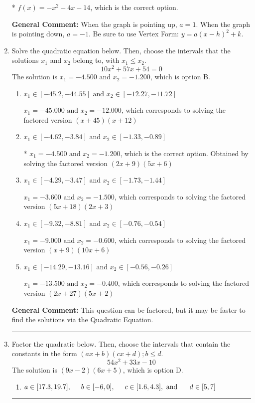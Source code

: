 \documentclass{extbook}[14pt]
\newcommand{\litem}[1]{\item #1

\rule{\textwidth}{0.4pt}}
\begin{document}
\begin{enumerate}
{\begin{enumerate}[label=\Alph*.]
* $f(x)=-x^{2} +4 x -14$, which is the correct option.
\end{enumerate}

\textbf{General Comment:} When the graph is pointing up, $a=1$. When the graph is pointing down, $a=-1$. Be sure to use Vertex Form: $y = a(x-h)^2+k$.
}
\litem{
Solve the quadratic equation below. Then, choose the intervals that the solutions $x_1$ and $x_2$ belong to, with $x_1 \leq x_2$.
\[ 10x^{2} +57 x + 54 = 0 \]
The solution is \( x_1 = -4.500 \text{ and } x_2 = -1.200 \), which is option B.\begin{enumerate}[label=\Alph*.]
\item \( x_1 \in [-45.2, -44.55] \text{ and } x_2 \in [-12.27, -11.72] \)

$x_1 = -45.000 \text{ and } x_2 = -12.000$, which corresponds to solving the factored version $(x + 45)(x + 12)$
\item \( x_1 \in [-4.62, -3.84] \text{ and } x_2 \in [-1.33, -0.89] \)

* $x_1 = -4.500 \text{ and } x_2 = -1.200$, which is the correct option. Obtained by solving the factored version $(2x + 9)(5x + 6)$
\item \( x_1 \in [-4.29, -3.47] \text{ and } x_2 \in [-1.73, -1.44] \)

$x_1 = -3.600 \text{ and } x_2 = -1.500$, which corresponds to solving the factored version $(5x + 18)(2x + 3)$
\item \( x_1 \in [-9.32, -8.81] \text{ and } x_2 \in [-0.76, -0.54] \)

$x_1 = -9.000 \text{ and } x_2 = -0.600$, which corresponds to solving the factored version $(x + 9)(10x + 6)$
\item \( x_1 \in [-14.29, -13.16] \text{ and } x_2 \in [-0.56, -0.26] \)

$x_1 = -13.500 \text{ and } x_2 = -0.400$, which corresponds to solving the factored version $(2x + 27)(5x + 2)$
\end{enumerate}

\textbf{General Comment:} This question can be factored, but it may be faster to find the solutions via the Quadratic Equation.
}
\litem{
Factor the quadratic below. Then, choose the intervals that contain the constants in the form $(ax+b)(cx+d); b \leq d.$
\[ 54x^{2} +33 x -10 \]
The solution is \( (9x -2)(6x + 5) \), which is option D.\begin{enumerate}[label=\Alph*.]
\item \( a \in [17.3, 19.7], \hspace*{5mm} b \in [-6, 0], \hspace*{5mm} c \in [1.6, 4.3], \text{ and } \hspace*{5mm} d \in [5, 7] \)


\end{enumerate}}
\end{enumerate}
\end{document}
